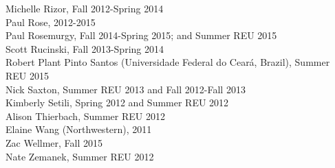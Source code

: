 \documentclass[9pt]{extarticle}
\begin{document}
Michelle Rizor, Fall 2012-Spring 2014 \\
Paul Rose, 2012-2015 \\
Paul Rosemurgy, Fall 2014-Spring 2015; and Summer REU 2015 \\
Scott Rucinski, Fall 2013-Spring 2014 \\
Robert Plant Pinto Santos (Universidade Federal do Cear\'{a}, Brazil), Summer REU 2015 \\
Nick Saxton, Summer REU 2013 and Fall 2012-Fall 2013 \\
Kimberly Setili, Spring 2012 and Summer REU 2012 \\
Alison Thierbach, Summer REU 2012 \\
Elaine Wang (Northwestern), 2011 \\
Zac Wellmer, Fall 2015 \\
Nate Zemanek, Summer REU 2012 \\
\end{document}
